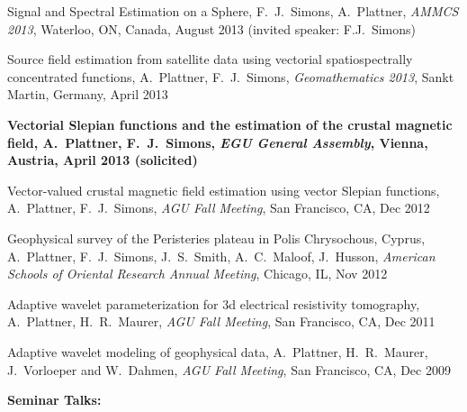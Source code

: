 \documentclass[10pt]{article}
\begin{document}
\spcp
Signal and Spectral Estimation on a Sphere,
F.~J.~Simons, A.~Plattner,
\emph{AMMCS 2013}, Waterloo, ON, Canada, August 2013 (invited speaker: F.J.~Simons)

\spcp
Source field estimation from satellite data using vectorial spatiospectrally 
concentrated functions,
A.~Plattner, F.~J.~Simons,
\emph{Geomathematics 2013}, Sankt Martin, Germany, April 2013

\spcp
\textbf{Vectorial Slepian functions and the estimation of the crustal magnetic field,
A.~Plattner, F.~J.~Simons,
\emph{EGU General Assembly}, Vienna, Austria, April 2013 (solicited)}

\spcp
Vector-valued crustal magnetic field estimation using vector Slepian functions,
A.~Plattner, F.~J.~Simons,
\emph{AGU Fall Meeting}, San Francisco, CA, Dec 2012

\spcp
Geophysical survey of the Peristeries plateau in Polis Chrysochous, Cyprus,
A.~Plattner, F.~J.~Simons, J.~S.~Smith, A.~C.~Maloof, J.~Husson,
\emph{American Schools of Oriental Research Annual Meeting}, Chicago, IL, Nov 2012

\spcp
Adaptive wavelet parameterization for 3d electrical resistivity tomography,
A.~Plattner, H.~R.~Maurer, 
\emph{AGU Fall Meeting}, San Francisco, CA, Dec 2011

\spcp
Adaptive wavelet modeling of geophysical data,
A.~Plattner, H.~R.~Maurer, J.~Vorloeper and W.~Dahmen, 
\emph{AGU Fall Meeting}, San Francisco, CA, Dec 2009




\spc
\textbf{\tsize Seminar Talks:}
\end{document}
